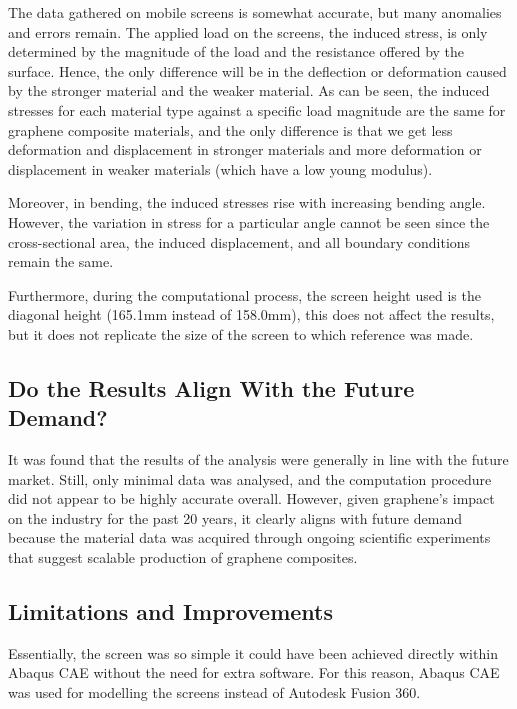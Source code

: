 \documentclass[a4paper,12pt]{article}
\numberwithin{equation}{section}
\numberwithin{figure}{section}
\begin{document}
\noindent The data gathered on mobile screens is somewhat accurate, but many anomalies and errors remain. The applied load on the screens, the induced stress, is only determined by the magnitude of the load and the resistance offered by the surface. Hence, the only difference will be in the deflection or deformation caused by the stronger material and the weaker material. As can be seen, the induced stresses for each material type against a specific load magnitude are the same for graphene composite materials, and the only difference is that we get less deformation and displacement in stronger materials and more deformation or displacement in weaker materials (which have a low young modulus).\vspace{\baselineskip}

\noindent Moreover, in bending, the induced stresses rise with increasing bending angle. However, the variation in stress for a particular angle cannot be seen since the cross-sectional area, the induced displacement, and all boundary conditions remain the same.\vspace{\baselineskip}

\noindent Furthermore, during the computational process, the screen height used is the diagonal height (165.1mm instead of 158.0mm), this does not affect the results, but it does not replicate the size of the screen to which reference was made.

\subsection{Do the Results Align With the Future Demand?}

\noindent It was found that the results of the analysis were generally in line with the future market. Still, only minimal data was analysed, and the computation procedure did not appear to be highly accurate overall. However, given graphene's impact on the industry for the past 20 years, it clearly aligns with future demand because the material data was acquired through ongoing scientific experiments that suggest scalable production of graphene composites.

\subsection{Limitations and Improvements}

\noindent Essentially, the screen was so simple it could have been achieved directly within Abaqus CAE without the need for extra software. For this reason, Abaqus CAE was used for modelling the screens instead of Autodesk Fusion 360.\vspace{\baselineskip}
\end{document}
